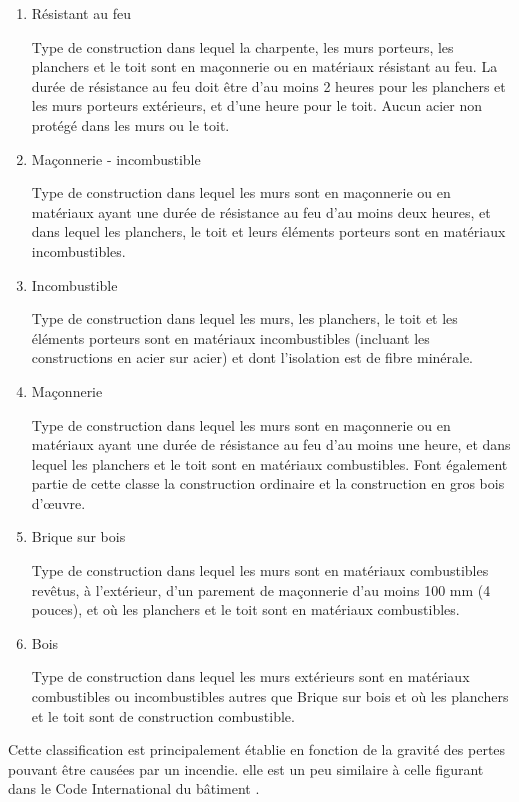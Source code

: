 \documentclass[11pt]{article}
\begin{document}
\begin{enumerate}

\item	Résistant au feu
 
Type de construction dans lequel la charpente, les murs porteurs, les planchers et le toit sont en maçonnerie ou en matériaux résistant au feu. La durée de résistance au feu doit être d'au moins 2 heures pour les planchers et les murs porteurs extérieurs, et d'une heure pour le toit.  Aucun acier non protégé dans les murs ou le toit.

\item	Maçonnerie - incombustible 

Type de construction dans lequel les murs sont en maçonnerie ou en matériaux ayant une durée de résistance au feu d'au moins deux heures, et dans lequel les planchers, le toit et leurs éléments porteurs sont en matériaux incombustibles.

\item	Incombustible 

Type de construction dans lequel les murs, les planchers, le toit et les éléments porteurs sont en matériaux incombustibles (incluant les constructions en acier sur acier) et dont l'isolation est de fibre minérale. 

\item	Maçonnerie 

Type de construction dans lequel les murs sont en maçonnerie ou en matériaux ayant une durée de résistance au feu d'au moins une heure, et dans lequel les planchers et le toit sont en matériaux combustibles. Font également partie de cette classe la construction ordinaire et la construction en gros bois d'œuvre.

\item	Brique sur bois 

Type de construction dans lequel les murs sont en matériaux combustibles revêtus, à l'extérieur, d'un parement de maçonnerie d'au moins 100 mm (4 pouces), et où les planchers et le toit sont en matériaux combustibles.

\item	Bois  

Type de construction dans lequel les murs extérieurs sont en matériaux combustibles ou incombustibles autres que Brique sur bois et où les planchers et le toit sont de construction combustible.
\end{enumerate}

Cette classification est principalement établie en fonction de la gravité des pertes pouvant être causées par un incendie. elle est un peu similaire à celle figurant dans le Code International du bâtiment \cite{IBC}.
\end{document}
